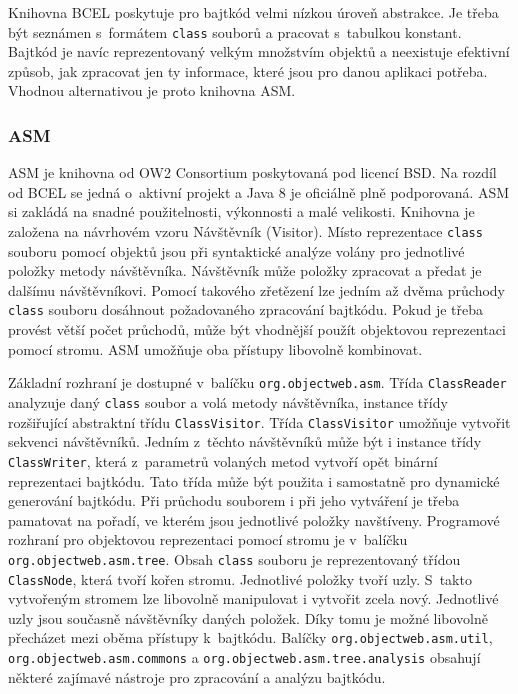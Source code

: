 Knihovna BCEL poskytuje pro bajtkód velmi nízkou úroveň abstrakce. Je třeba být seznámen s~formátem \texttt{class} souborů a pracovat s~tabulkou konstant. Bajtkód je navíc reprezentovaný velkým množstvím objektů a neexistuje efektivní způsob, jak zpracovat jen ty informace, které jsou pro danou aplikaci potřeba. Vhodnou alternativou je proto knihovna ASM.




\subsubsection{ASM}\label{ToolsASM}

ASM \cite{ASM} je knihovna od OW2 Consortium poskytovaná pod licencí BSD. Na rozdíl od BCEL se jedná o~aktivní projekt a Java 8 je oficiálně plně podporovaná. ASM si zakládá na snadné použitelnosti, výkonnosti a malé velikosti. 
Knihovna je založena na návrhovém vzoru Návštěvník (Visitor). Místo reprezentace \texttt{class} souboru pomocí objektů jsou při syntaktické analýze volány pro jednotlivé položky metody návštěvníka. Návštěvník může položky zpracovat a předat je dalšímu návštěvníkovi. Pomocí takového zřetězení lze jedním až dvěma průchody \texttt{class} souboru dosáhnout požadovaného zpracování bajtkódu. Pokud je třeba provést větší počet průchodů, může být vhodnější použít objektovou reprezentaci pomocí stromu. ASM umožňuje oba přístupy libovolně kombinovat.

Základní rozhraní je dostupné v~balíčku \texttt{org.objectweb.asm}. Třída \texttt{ClassReader} analyzuje daný \texttt{class} soubor a volá metody návštěvníka, instance třídy rozšiřující abstraktní třídu \texttt{ClassVisitor}. Třída \texttt{ClassVisitor} umožňuje vytvořit sekvenci návštěvníků. Jedním z~těchto návštěvníků může být i instance třídy \texttt{ClassWriter}, která z~parametrů volaných metod vytvoří opět binární reprezentaci bajtkódu. Tato třída může být použita i samostatně pro dynamické generování bajtkódu. Při průchodu souborem i při jeho vytváření je třeba pamatovat na pořadí, ve kterém jsou jednotlivé položky navštíveny.
Programové rozhraní pro objektovou reprezentaci pomocí stromu je v~balíčku \texttt{org.objectweb.asm.tree}. Obsah \texttt{class} souboru je reprezentovaný třídou \texttt{ClassNode}, která tvoří kořen stromu. Jednotlivé položky tvoří uzly. S~takto vytvořeným stromem lze libovolně manipulovat i vytvořit zcela nový. Jednotlivé uzly jsou současně návštěvníky daných položek. Díky tomu je možné libovolně přecházet mezi oběma přístupy k~bajtkódu.
Balíčky \texttt{org.objectweb.asm.util}, \texttt{org.objectweb.asm.commons} a \texttt{org.objectweb.asm.tree.analysis} obsahují některé zajímavé nástroje pro zpracování a analýzu bajtkódu.

